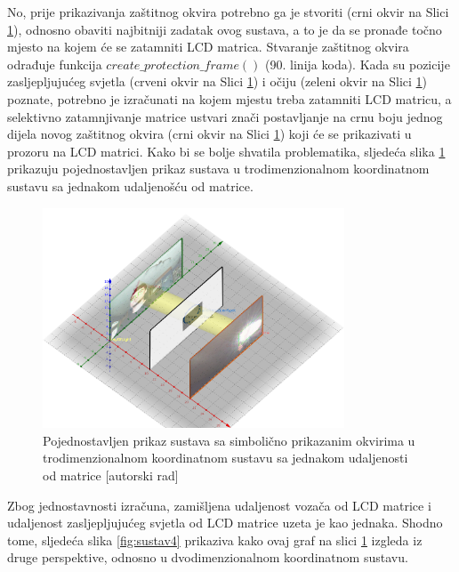 \documentclass{foi}
\begin{document}
No, prije prikazivanja zaštitnog okvira potrebno ga je stvoriti (crni okvir na Slici \ref{fig:sustav6}), odnosno obaviti najbitniji zadatak ovog sustava, a to je da se pronađe točno mjesto na kojem će se zatamniti LCD matrica. Stvaranje zaštitnog okvira odrađuje funkcija $create\_protection\_frame()$ (90. linija koda). Kada su pozicije zasljepljujućeg svjetla (crveni okvir na Slici \ref{fig:sustav6}) i očiju (zeleni okvir na Slici \ref{fig:sustav6}) poznate, potrebno je izračunati na kojem mjestu treba zatamniti LCD matricu, a selektivno zatamnjivanje matrice ustvari znači postavljanje na crnu boju jednog dijela novog zaštitnog okvira (crni okvir na Slici \ref{fig:sustav6}) koji će se prikazivati u prozoru na LCD matrici. Kako bi se bolje shvatila problematika, sljedeća slika \ref{fig:sustav6} prikazuju pojednostavljen prikaz sustava u trodimenzionalnom koordinatnom sustavu sa jednakom udaljenošću od matrice.

\begin{figure}[h!]
    \centering
    \includegraphics[width=0.8\textwidth]{slike/sustav6}
    \caption{Pojednostavljen prikaz sustava sa simbolično prikazanim okvirima u trodimenzionalnom koordinatnom sustavu sa jednakom udaljenosti od matrice [autorski rad]}
    \label{fig:sustav6}
\end{figure}

Zbog jednostavnosti izračuna, zamišljena udaljenost vozača od LCD matrice i udaljenost zasljepljujućeg svjetla od LCD matrice uzeta je kao jednaka. Shodno tome, sljedeća slika \ref{fig:sustav4} prikaziva kako ovaj graf na slici \ref{fig:sustav6} izgleda iz druge perspektive, odnosno u dvodimenzionalnom koordinatnom sustavu.
\end{document}
